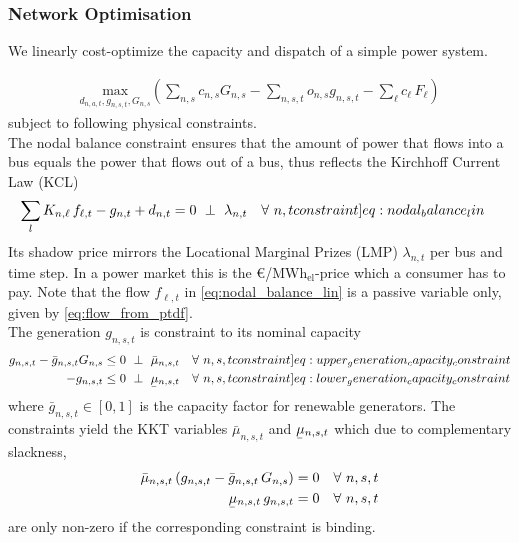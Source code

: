 \documentclass[11pt,twocolumn]{article}
\newcommand{\ubar}[1]{\underaccent{\bar}{#1}}
\newcommand{\generation}[1][n]{g_{#1,s,t}}
\newcommand{\generationpotential}{\bar{g}_{n,s,t}}
\newcommand{\nodalgeneration}[1][n]{g_{#1,t}}
\newcommand{\capacityGeneration}{G_{n,s}}
\newcommand{\capacityFlow}{F_{\ell}}
\newcommand{\capexGeneration}{c_{n,s}}
\newcommand{\capexFlow}{c_{\ell}}
\newcommand{\opexGeneration}[1][n]{o_{#1,s}}
\newcommand{\demand}[1][n]{d_{#1,a,t}}
\newcommand{\nodaldemand}[1][n]{d_{#1,t}}
\newcommand{\incidence}[1][n]{K_{#1,\ell}}
\newcommand{\mulowergeneration}[1][n]{\ubar{\mu}_{#1,s,t}}
\newcommand{\muuppergeneration}[1][n]{\bar{\mu}_{#1,s,t}}
\newcommand{\lmp}[1][n]{\lambda_{#1,t}}
\newcommand{\flow}{f_{\ell,t}}
\newcommand{\megawatthour}{MWh$_\text{el}$}
\newcommand{\resultsin}[1]{\hspace{6pt} \bot  \hspace{6pt} #1}
\newcommand{\Forall}[1]{\hspace{10pt} \forall \,\, #1 }
\begin{document}
\subsubsection*{Network Optimisation}

% 
% 

We linearly cost-optimize the capacity and dispatch of a simple power system. 

\begin{align}
    \underset{\demand, \generation, \capacityGeneration}{\text{max}}
    \left(\sum_{n,s} \capexGeneration \capacityGeneration - \sum_{n, s, t} \opexGeneration \generation - \sum_{\ell} \capexFlow \, \capacityFlow \right) \label{eq:minisation}
\end{align}
subject to following physical constraints. 
\\

The nodal balance constraint ensures that the amount of power that flows into a bus equals the power that flows out of a bus, thus reflects the Kirchhoff Current Law (KCL)
\begin{align}
    \sum_l \incidence \, \flow  - \nodalgeneration + \nodaldemand &= 0 \resultsin{\lmp} \Forall{n,t}
    \label[constraint]{eq:nodal_balance_lin}
\end{align}
Its shadow price mirrors the Locational Marginal Prizes (LMP) $\lmp$ per bus and time step. In a power market this is the \euro/\megawatthour-price which a consumer has to pay. Note that the flow $\flow$ in \cref{eq:nodal_balance_lin} is a passive variable only, given by \cref{eq:flow_from_ptdf}.\\

The generation $\generation$ is constraint to its nominal capacity
\begin{align}
 \generation - \generationpotential \capacityGeneration  &\le 0 \resultsin{\muuppergeneration} \Forall{n,s,t} 
 \label[constraint]{eq:upper_generation_capacity_constraint}\\ 
 - \generation &\le 0 \resultsin{\mulowergeneration} \Forall{n,s,t} 
 \label[constraint]{eq:lower_generation_capacity_constraint}
 \end{align}
where $\generationpotential \in \left[ 0,1\right]$ is the capacity factor for renewable generators. The constraints yield the KKT variables $\muuppergeneration$ and $\mulowergeneration$ which due to complementary slackness,
\begin{align}
\muuppergeneration \left( \generation - \generationpotential \, \capacityGeneration \right)  &= 0  \Forall{n,s,t} 
\label{eq:complementary_slackness_upper_generation} \\
\mulowergeneration  \, \generation &= 0 \Forall{n,s,t}
\label{eq:complementary_slackness_lower_generation} 
\end{align}
are only non-zero if the corresponding constraint is binding. \\
\end{document}
